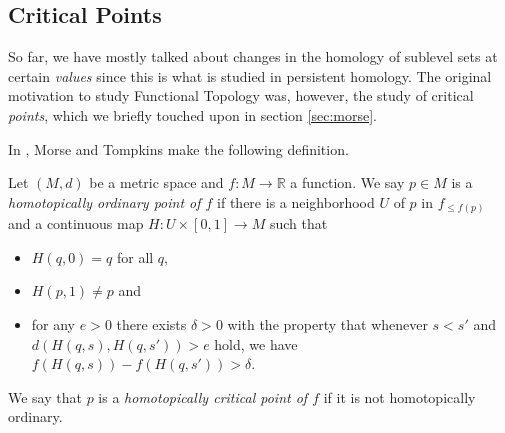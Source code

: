 


\subsection{Critical Points}
So far, we have mostly talked about changes in the homology of sublevel sets at certain \emph{values} since this is what is studied in persistent homology. The original motivation to study Functional Topology was, however, the study of critical \emph{points}, which we briefly touched upon in section \ref{sec:morse}.

In \cite{Morse.1939}, Morse and Tompkins make the following definition.

\begin{defi}
Let $(M,d)$ be a metric space and $f\colon M\to\mathbb{R}$ a function. We say $p\in M$ is a \emph{homotopically ordinary point of $f$} if there is a neighborhood $U$ of $p$ in $f_{\leq f(p)}$ and a continuous map $H\colon U\times[0,1]\to M$ such that
\begin{itemize}
\item $H(q,0)=q$ for all $q$,
\item $H(p,1)\neq p$ and
\item for any $e>0$ there exists $\delta>0$ with the property that whenever $s<s'$ and $d(H(q,s),H(q,s'))>e$ hold, we have $f(H(q,s))-f(H(q,s'))>\delta$.
\end{itemize}
We say that $p$ is a \emph{homotopically critical point of $f$} if it is not homotopically ordinary.
\end{defi}

